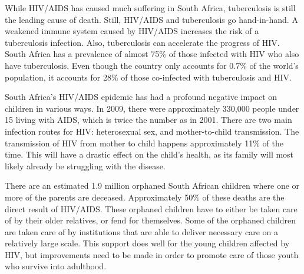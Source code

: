 \documentclass[12pt]{report}
\begin{document}
While HIV/AIDS has caused much suffering in South Africa, tuberculosis is still the leading cause of death.
Still, HIV/AIDS and tuberculosis go hand-in-hand.
A weakened immune system caused by HIV/AIDS increases the risk of a tuberculosis infection.
Also, tuberculosis can accelerate the progress of HIV.
South Africa has a prevalence of almost 75\% of those infected with HIV who also have tuberculosis.
Even though the country only accounts for 0.7\% of the world's population, it accounts for 28\% of those co-infected with tuberculosis and HIV.



South Africa's HIV/AIDS epidemic has had a profound negative impact on children in various ways.  
In 2009, there were approximately 330,000 people under 15 living with AIDS, which is twice the number as in 2001.
There are two main infection routes for HIV: heterosexual sex, and mother-to-child transmission.  The transmission of HIV from mother to child happens approximately 11\% of the time.
This will have a drastic effect on the child's health, as its family will most likely already be struggling with the disease\cite{avert}.

There are an estimated 1.9 million orphaned South African children where one or more of the parents are deceased.
Approximately 50\% of these deaths are the direct result of HIV/AIDS\cite{avert}.
These orphaned children have to either be taken care of by their older relatives, or fend for themselves.
Some of the orphaned children are taken care of by institutions that are able to deliver necessary care on a relatively large scale.
This support does well for the young children affected by HIV, but improvements need to be made in order to promote care of those youth who survive into adulthood.
\end{document}
